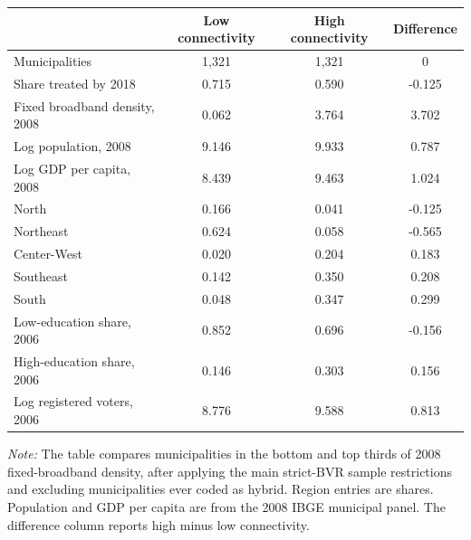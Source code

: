 \begin{threeparttable}
\caption{Baseline differences by pre-BVR connectivity}
\label{tab:connectivity-balance}
\begin{tabular}{lccc}
\toprule
 & Low connectivity & High connectivity & Difference \\
\midrule
Municipalities & 1,321 & 1,321 & 0 \\
Share treated by 2018 & 0.715 & 0.590 & -0.125 \\
Fixed broadband density, 2008 & 0.062 & 3.764 & 3.702 \\
Log population, 2008 & 9.146 & 9.933 & 0.787 \\
Log GDP per capita, 2008 & 8.439 & 9.463 & 1.024 \\
North & 0.166 & 0.041 & -0.125 \\
Northeast & 0.624 & 0.058 & -0.565 \\
Center-West & 0.020 & 0.204 & 0.183 \\
Southeast & 0.142 & 0.350 & 0.208 \\
South & 0.048 & 0.347 & 0.299 \\
Low-education share, 2006 & 0.852 & 0.696 & -0.156 \\
High-education share, 2006 & 0.146 & 0.303 & 0.156 \\
Log registered voters, 2006 & 8.776 & 9.588 & 0.813 \\
\bottomrule
\end{tabular}
\begin{tablenotes}[flushleft]
\footnotesize
\item \textit{Note:} The table compares municipalities in the bottom and top thirds of 2008 fixed-broadband density, after applying the main strict-BVR sample restrictions and excluding municipalities ever coded as hybrid. Region entries are shares. Population and GDP per capita are from the 2008 IBGE municipal panel. The difference column reports high minus low connectivity.
\end{tablenotes}
\end{threeparttable}
